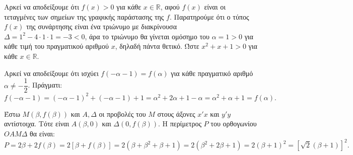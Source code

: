 
\begin{alist}
\item Αρκεί να αποδείξουμε ότι $f(x) > 0$ για κάθε $x \in \mathbb{R}$, αφού $f(x)$ είναι οι τεταγμένες των σημείων της γραφικής παράστασης της $f$. Παρατηρούμε ότι ο τύπος $f(x)$ της συνάρτησης είναι ένα τριώνυμο με διακρίνουσα $\Delta = 1^2 - 4 \cdot 1 \cdot 1 = -3 < 0$, άρα το τριώνυμο θα γίνεται ομόσημο του $\alpha = 1 > 0$ για κάθε τιμή του πραγματικού αριθμού $x$, δηλαδή πάντα θετικό. Ώστε $x^2 + x + 1 > 0$ για κάθε $x \in \mathbb{R}$.

\item Αρκεί να αποδείξουμε ότι ισχύει $f(-\alpha - 1) = f(\alpha)$ για κάθε πραγματικό αριθμό $\alpha \ne -\dfrac{1}{2}$. Πράγματι: 
\[f(-\alpha - 1) = (-\alpha - 1)^2 + (-\alpha - 1) + 1 = \alpha^2 + 2\alpha + 1 - \alpha = \alpha^2 + \alpha + 1 = f(\alpha).\]

\item Έστω $M(\beta, f(\beta))$ και $A, \Delta$ οι προβολές του $M$ στους άξονες $x'x$ και $y'y$ αντίστοιχα. Τότε είναι $A(\beta, 0)$ και $\Delta(0, f(\beta))$. Η περίμετρος $P$ του ορθογωνίου $OAM\Delta$ θα είναι:
\[P = 2\beta + 2f(\beta) = 2[\beta + f(\beta)] = 2(\beta + \beta^2 + \beta + 1) = 2(\beta^2 + 2\beta + 1) = 2(\beta + 1)^2 = [\sqrt{2}(\beta + 1)]^2.\]
\end{alist}

